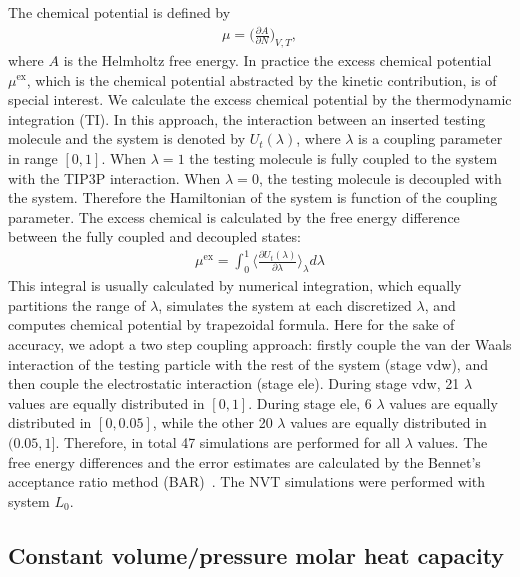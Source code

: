 \documentclass[a4paper,preprint,unsortedaddress,onecolumn,fleqn]{revtex4}
\begin{document}
The chemical potential is defined by 
\begin{align}
\mu = \Big(\frac{\partial A}{\partial N}\Big)_{V,T},
\end{align}
where $A$ is the Helmholtz free energy. In practice the excess chemical
potential $\mu^\text{ex}$, which is the chemical potential abstracted by the
kinetic contribution, is of special interest. We calculate the excess
chemical potential by the thermodynamic integration (TI). In this approach,
the interaction between an inserted testing molecule and the system is
denoted by $U_t(\lambda)$, where $\lambda$ is a coupling parameter in range $%
[0,1]$. When $\lambda = 1$ the testing molecule is fully coupled to the
system with the TIP3P interaction. When $\lambda=0$, the testing molecule is
decoupled with the system. Therefore the Hamiltonian of the system is
function of the coupling parameter. The excess chemical is calculated by the
free energy difference between the fully coupled and decoupled states: 
\begin{align}
\mu^\text{ex} = \int_0^1 \Big\langle \frac{\partial U_t(\lambda)}{\partial
\lambda} \Big\rangle_\lambda d\lambda
\end{align}
This integral is usually calculated by numerical integration, which equally
partitions the range of $\lambda$, simulates the system at each discretized $%
\lambda$, and computes chemical potential by trapezoidal formula. Here for
the sake of accuracy, we adopt a two step coupling approach: firstly couple
the van der Waals interaction of the testing particle with the rest of the
system (stage vdw), and then couple the electrostatic interaction (stage
ele). During stage vdw, 21 $\lambda$ values are equally distributed in $%
[0,1] $. During stage ele, 6 $\lambda$ values are equally distributed in $%
[0,0.05]$, while the other 20 $\lambda$ values are equally distributed in $%
(0.05, 1]$. Therefore, in total 47 simulations are performed for all $%
\lambda $ values. The free energy differences and the error estimates are
calculated by the Bennet's acceptance ratio method (BAR)~\cite%
{bennett1976efficient}. The NVT simulations were performed with system $L_0$.

\subsection{Constant volume/pressure molar heat capacity}
\end{document}

